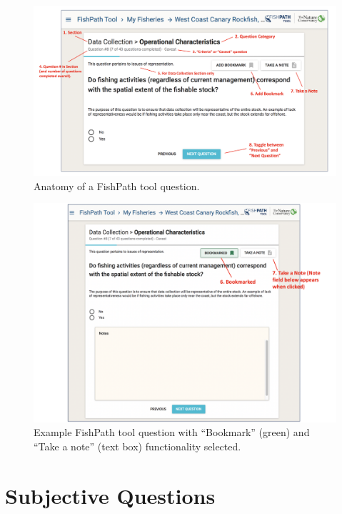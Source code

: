 \documentclass[
  11pt,
]{book}
\begin{document}
\begin{figure}
 
 {\centering \includegraphics[width=0.95\linewidth]{images/question-anatomy} 
 
 }
 
 \caption{Anatomy of a FishPath tool question.}\label{fig:question-anatomy}
 \end{figure}

\begin{figure}
 
 {\centering \includegraphics[width=0.95\linewidth]{images/bookmark-notes} 
 
 }
 
 \caption{Example FishPath tool question with “Bookmark” (green) and “Take a note” (text box) functionality selected.}\label{fig:bookmark-notes}
 \end{figure}

\hypertarget{subjective-questions}{%
\section{Subjective Questions}\label{subjective-questions}}
\end{document}
